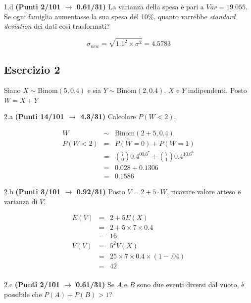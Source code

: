\documentclass[
  11pt,
]{book}
\theoremstyle{mytheoremstyle}
\theoremstyle{mydefstyle}
\newenvironment{sol}
  {
  \begin{tcolorbox}[enhanced,breakable,arc=0.1mm,boxrule=1pt,colback=white,colframe=iblue,
  title=\bf \fontfamily{lmss}\selectfont \hspace{.5 cm} Soluzione,drop fuzzy shadow]

}{
\end{tcolorbox}
  }
\begin{document}
1.d \textbf{(Punti 2/101 \(\rightarrow\) 0.61/31)} La varianza della spesa è pari a \(Var=19.055\).
Se ogni famiglia aumentasse la sua spesa del 10\%, quanto varrebbe \emph{standard deviation} dei dati così trasformati?

\begin{sol}
\[\sigma_{new}=\sqrt{1.1^2\times \sigma^2}=4.5783\]

\end{sol}

\subsection{Esercizio 2}\label{esercizio-2-13}

Siano \(X\sim \text{Binom}(5,0.4)\) e sia \(Y\sim \text{Binom}(2,0.4)\), \(X\) e \(Y\) indipendenti. Posto \(W=X+Y\)

2.a \textbf{(Punti 14/101 \(\rightarrow\) 4.3/31)} Calcolare \(P(W< 2)\).

\begin{sol}
\begin{eqnarray*}
  W &\sim& \text{Binom}(2+5,0.4)\\
  P(W<2) &=& P(W=0)+P(W=1)\\
  &=& \binom{7}{0}0.4^00.6^7+\binom{7}{1}0.4^10.6^6\\
  &=& 0.028+0.1306\\
  &=&0.1586
\end{eqnarray*}

\end{sol}

2.b \textbf{(Punti 3/101 \(\rightarrow\) 0.92/31)} Posto \(V=2+5\cdot W\), ricavare valore atteso e varianza di \(V\).

\begin{sol}
\begin{eqnarray*}
  E(V) &=& 2+5E(X)  \\
  &=& 2+5\times 7 \times 0.4\\
  &=& 16\\
  V(V) &=& 5^2V(X)  \\
  &=& 25\times 7\times 0.4\times (1-.04)\\
  &=& 42\\
\end{eqnarray*}

\end{sol}

2.c \textbf{(Punti 2/101 \(\rightarrow\) 0.61/31)} Se \(A\) e \(B\) sono due eventi diversi dal vuoto, è possibile che \(P(A)+P(B)>1\)?
\end{document}
